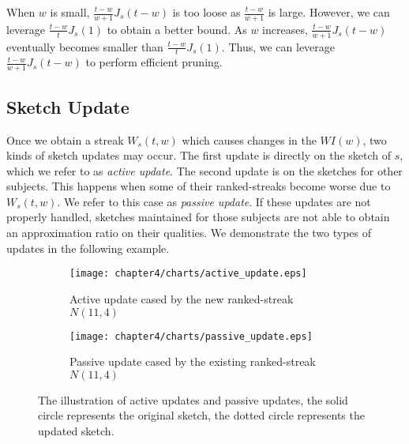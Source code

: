 When $w$ is small, $\frac{t-w}{w+1}J_s(t-w)$ is too loose as $\frac{t-w}{w+1}$ is large. However, we can leverage $\frac{t-w}{t}J_s(1)$ to obtain a better bound. As $w$ increases, $\frac{t-w}{w+1}J_s(t-w)$ eventually becomes smaller than $\frac{t-w}{t}J_s(1)$. Thus, we can leverage $\frac{t-w}{w+1}J_s(t-w)$ to perform efficient pruning. 


\subsection{Sketch Update}
\label{subsec:sketch_main}
Once we obtain a streak $W_s(t,w)$ which causes changes in the $WI(w)$, 
two kinds of sketch updates may occur. The first update is directly
on the sketch of $s$,
which we refer to as \emph{active update}.
The second update is on the sketches for other subjects. 
This happens when some of their ranked-streaks become worse due to $W_s(t,w)$. 
We refer to this case as \emph{passive update}. If these 
updates are not properly handled, sketches maintained for those subjects 
are not able to obtain an approximation ratio on their qualities. 
We demonstrate the two types of updates in the following example.

\begin{figure}[h]
	\centering
    \begin{subfigure}[b]{0.453\textwidth}
        \texttt{[image: chapter4/charts/active\_update.eps]}
        \caption{Active update cased by the new ranked-streak $N(11,4)$}
    \end{subfigure}
    \begin{subfigure}[b]{0.45\textwidth}
        \texttt{[image: chapter4/charts/passive\_update.eps]}
        \caption{Passive update cased by the existing ranked-streak $N(11,4)$ }
    \end{subfigure}
    \caption{The illustration of active updates and passive updates, the solid circle represents the original
    sketch, the dotted circle represents the updated sketch.}
    \label{fig:sketch_maintenance}
\end{figure}


